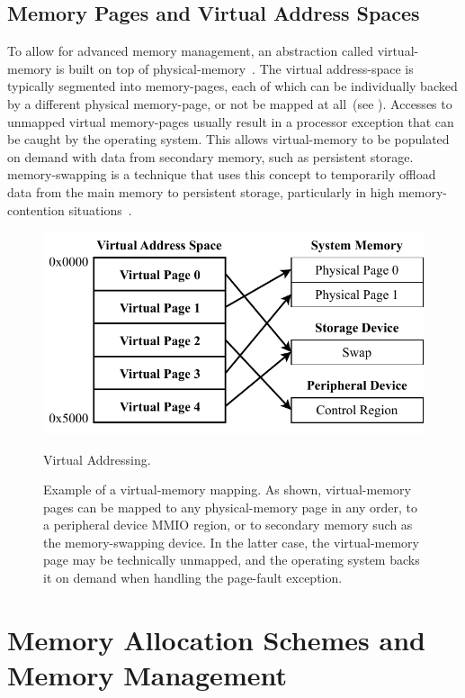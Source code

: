\subsection{Memory Pages and Virtual Address Spaces}

To allow for advanced memory management, an abstraction called \gls{virtual-memory} is built on top of \gls{physical-memory}~\cite{os-concepts}. The virtual \gls{address-space} is typically segmented into \glspl{memory-page}, each of which can be individually backed by a different physical \gls{memory-page}, or not be mapped at all~(see ). Accesses to unmapped virtual \glspl{memory-page} usually result in a processor exception that can be caught by the operating system. This allows \gls{virtual-memory} to be populated on demand with data from secondary memory, such as persistent storage. \Gls{memory-swapping} is a technique that uses this concept to temporarily offload data from the main memory to persistent storage, particularly in high \gls{memory-contention} situations~\cite{os-concepts,linux-swap}.

\begin{figure}[htb]
  \centering
  \includegraphics{Figures/VMem.pdf}
  \caption{Virtual Addressing.}
  \label{fig:vmem}
  \caption*{Example of a \gls{virtual-memory} mapping. As shown, \gls{virtual-memory} pages can be mapped to any \gls{physical-memory} page in any order, to a peripheral device \gls{MMIO} region, or to secondary memory such as the \gls{memory-swapping} device. In the latter case, the \gls{virtual-memory} page may be technically unmapped, and the operating system backs it on demand when handling the \gls{page-fault} exception.}
\end{figure}

\section{Memory Allocation Schemes and Memory Management}

